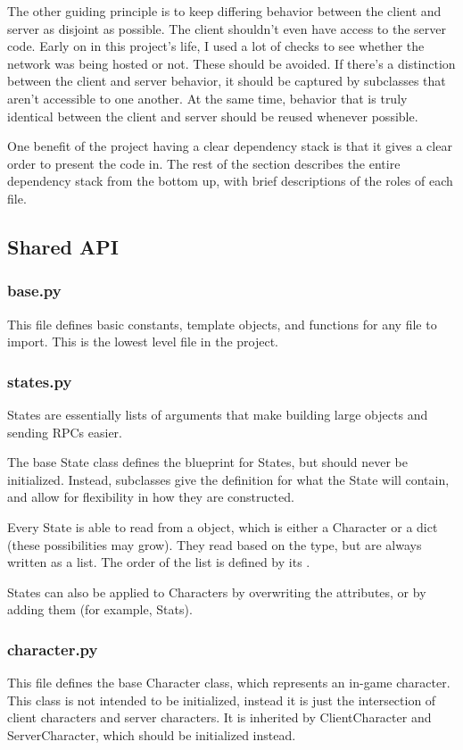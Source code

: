 \documentclass{article}
\begin{document}
The other guiding principle is to keep differing behavior between the client and server as disjoint as possible.
The client shouldn't even have access to the server code. Early on in this project's life, I used a lot of checks
to see whether the network was being hosted or not. These should be avoided. If there's a distinction between
the client and server behavior, it should be captured by subclasses that aren't accessible to one another.
At the same time, behavior that is truly identical between the client and server should be reused whenever
possible.

One benefit of the project having a clear dependency stack is that it gives a clear order to present the code in.
The rest of the section describes the entire dependency stack from the bottom up, with brief descriptions of the roles
of each file.
\subsection{Shared API}
\subsubsection{base.py}
This file defines basic constants, template objects, and functions for any file to import.
This is the lowest level file in the project.
\subsubsection{states.py}
States are essentially lists of arguments that make building large objects
and sending RPCs easier.

The base State class defines the blueprint for States, but should never be initialized.
Instead, subclasses give the definition for what the State will contain, and
allow for flexibility in how they are constructed.

Every State is able to read from a  object, which is either a Character
or a dict (these possibilities may grow). They read based on the type, but are always
written as a list. The order of the list is defined by its .

States can also be applied to Characters by overwriting the attributes, or by adding them
(for example, Stats).
\subsubsection{character.py}
This file defines the base Character class, which represents an in-game character.
This class is not intended to be initialized,
instead it is just the intersection of client characters and server characters. It is
inherited by ClientCharacter and ServerCharacter, which should be initialized instead.
\end{document}
